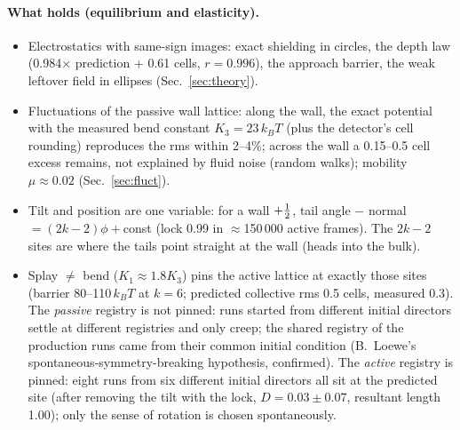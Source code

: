 \paragraph{What holds (equilibrium and elasticity).}
\begin{itemize}
  \item Electrostatics with same-sign images: exact shielding in circles, the depth law (0.984$\times$ prediction + 0.61 cells, $r=0.996$), the approach barrier,
        the weak leftover field in ellipses (Sec.~\ref{sec:theory}).
  \item Fluctuations of the passive wall lattice: along the wall, the exact potential with the measured bend constant $K_3=23\,k_BT$ (plus the detector's cell
        rounding) reproduces the rms within 2--4\%; across the wall a 0.15--0.5 cell excess remains, not explained by fluid noise (random walks); mobility
        $\mu\approx0.02$ (Sec.~\ref{sec:fluct}).
  \item Tilt and position are one variable: for a wall $+\tfrac12$, tail angle $-$ normal $=(2k-2)\phi+$const (lock 0.99 in $\approx$150\,000 active frames). The $2k-2$
        sites are where the tails point straight at the wall (heads into the bulk).
  \item Splay $\neq$ bend ($K_1\approx1.8K_3$) pins the active lattice at exactly those sites (barrier 80--110\,$k_BT$ at $k=6$; predicted collective rms 0.5 cells,
        measured 0.3). The \emph{passive} registry is not pinned: runs started from different initial directors settle at different registries and only creep; the
        shared registry of the production runs came from their common initial condition (B.~Loewe's spontaneous-symmetry-breaking hypothesis, confirmed).
        The \emph{active} registry is pinned: eight runs from six different initial directors all sit at the predicted site (after removing the tilt with the
        lock, $D=0.03\pm0.07$, resultant length 1.00); only the sense of rotation is chosen spontaneously.
\end{itemize}

